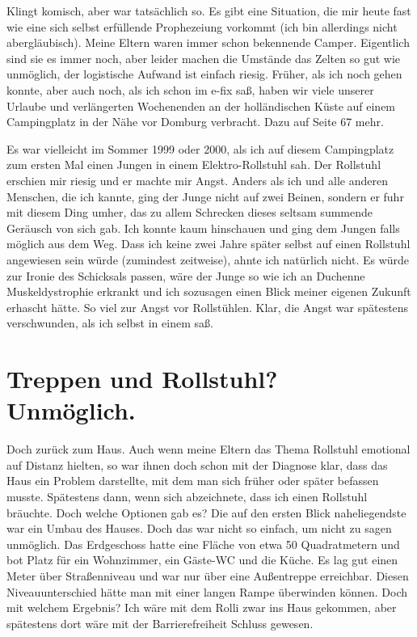 \documentclass[fontsize=12pt,a4paper,headinclude,DIV=calc,automark]{scrbook}
\begin{document}
Klingt komisch, aber war tatsächlich so. Es gibt eine Situation, die mir heute fast wie eine sich selbst erfüllende Prophezeiung vorkommt (ich bin allerdings nicht abergläubisch). Meine Eltern waren immer schon bekennende Camper. Eigentlich sind sie es immer noch, aber leider machen die Umstände das Zelten so gut wie unmöglich, der logistische Aufwand ist einfach riesig. Früher, als ich noch gehen konnte, aber auch noch, als ich schon im e-fix saß, haben wir viele unserer Urlaube und verlängerten Wochenenden an der holländischen Küste auf einem Campingplatz in der Nähe vor Domburg verbracht. Dazu auf Seite 67 mehr.

Es war vielleicht im Sommer 1999 oder 2000, als ich auf diesem Campingplatz zum ersten Mal einen Jungen in einem Elektro-Rollstuhl sah. Der Rollstuhl erschien mir riesig und er machte mir Angst. Anders als ich und alle anderen Menschen, die ich kannte, ging der Junge nicht auf zwei Beinen, sondern er fuhr mit diesem Ding umher, das zu allem Schrecken dieses seltsam summende Geräusch von sich gab. Ich konnte kaum hinschauen und ging dem Jungen falls möglich aus dem Weg. Dass ich keine zwei Jahre später selbst auf einen Rollstuhl angewiesen sein würde (zumindest zeitweise), ahnte ich natürlich nicht. Es würde zur Ironie des Schicksals passen, wäre der Junge so wie ich an Duchenne Muskeldystrophie erkrankt und ich sozusagen einen Blick meiner eigenen Zukunft erhascht hätte. So viel zur Angst vor Rollstühlen. Klar, die Angst war spätestens verschwunden, als ich selbst in einem saß.

\section{Treppen und Rollstuhl? Unmöglich.}

Doch zurück zum Haus. Auch wenn meine Eltern das Thema Rollstuhl emotional auf Distanz hielten, so war ihnen doch schon mit der Diagnose klar, dass das Haus ein Problem darstellte, mit dem man sich früher oder später befassen musste. Spätestens dann, wenn sich abzeichnete, dass ich einen Rollstuhl bräuchte.
Doch welche Optionen gab es? Die auf den ersten Blick naheliegendste war ein Umbau des Hauses. Doch das war nicht so einfach, um nicht zu sagen unmöglich. Das Erdgeschoss hatte eine Fläche von etwa 50 Quadratmetern und bot Platz für ein Wohnzimmer, ein Gäste-WC und die Küche. Es lag gut einen Meter über Straßenniveau und war nur über eine Außentreppe erreichbar. Diesen Niveauunterschied hätte man mit einer langen Rampe überwinden können. Doch mit welchem Ergebnis? Ich wäre mit dem Rolli zwar ins Haus gekommen, aber spätestens dort wäre mit der Barrierefreiheit Schluss gewesen.
\end{document}
